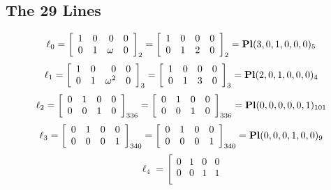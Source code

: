 \documentclass{article}
\begin{document}
{\subsection*{The 29 Lines}
$$
\ell_{0} = 
\left[
\begin{array}{*{4}{r}}
1 & 0 & 0 & 0\\
0 & 1 & \omega  & 0\\
\end{array}
\right]
_{2}
=
\left[
\begin{array}{*{4}c}
1  & 0  & 0  & 0\\
0  & 1  & 2  & 0\\
\end{array}
\right]_{2}
={\rm\bf Pl}(3,0,1,0,0,0 )_{5}$$
$$
\ell_{1} = 
\left[
\begin{array}{*{4}{r}}
1 & 0 & 0 & 0\\
0 & 1 & \omega^{2} & 0\\
\end{array}
\right]
_{3}
=
\left[
\begin{array}{*{4}c}
1  & 0  & 0  & 0\\
0  & 1  & 3  & 0\\
\end{array}
\right]_{3}
={\rm\bf Pl}(2,0,1,0,0,0 )_{4}$$
$$
\ell_{2} = 
\left[
\begin{array}{*{4}{r}}
0 & 1 & 0 & 0\\
0 & 0 & 1 & 0\\
\end{array}
\right]
_{336}
=
\left[
\begin{array}{*{4}c}
0  & 1  & 0  & 0\\
0  & 0  & 1  & 0\\
\end{array}
\right]_{336}
={\rm\bf Pl}(0,0,0,0,0,1 )_{101}$$
$$
\ell_{3} = 
\left[
\begin{array}{*{4}{r}}
0 & 1 & 0 & 0\\
0 & 0 & 0 & 1\\
\end{array}
\right]
_{340}
=
\left[
\begin{array}{*{4}c}
0  & 1  & 0  & 0\\
0  & 0  & 0  & 1\\
\end{array}
\right]_{340}
={\rm\bf Pl}(0,0,0,1,0,0 )_{9}$$
$$
\ell_{4} = 
\left[
\begin{array}{*{4}{r}}
0 & 1 & 0 & 0\\
0 & 0 & 1 & 1\\
\end{array}
$$}
\end{document}
